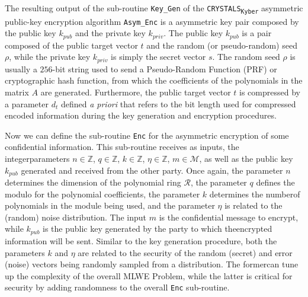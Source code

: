 \documentclass[runningheads]{llncs}
\numberwithin{equation}{section}
\begin{document}
    \noindent The resulting output of the sub-routine \texttt{Key\_Gen} of the \texorpdfstring{\texttt{CRYSTALS}\textsubscript{\texttt{Kyber}}}\/ asymmetric public-key encryption algorithm \texttt{Asym\_Enc} is a asymmetric key pair composed by the public key ${k}_{pub}$ and the private key ${k}_{priv}$. The public key ${k}_{pub}$ is a pair composed of the public target vector $t$ and the random (or pseudo-random) seed $\rho$, while the private key ${k}_{priv}$ is simply the secret vector $s$. The random seed $\rho$ is usually a $256$-bit string used to send a Pseudo-Random Function (PRF) or cryptographic hash function, from which the coefficients of the polynomials in the matrix $A$ are generated. Furthermore, the public target vector $t$ is compressed by a parameter ${d}_{t}$ defined \textit{a priori} that refers to the bit length used for compressed encoded information during the key generation and encryption procedures.

    Now we can define the sub-routine \texttt{Enc} for the asymmetric encryption of some confidential information. This sub-routine receives as inputs, the integer\break parameters $n \in \mathbb{Z}$, $q \in \mathbb{Z}$, $k \in \mathbb{Z}$, $\eta \in \mathbb{Z}$, $m \in \mathcal{M}$, as well as the public key ${k}_{pub}$ generated and received from the other party. Once again, the parameter $n$ determines the dimension of the polynomial ring $\mathcal{R}$, the parameter $q$ defines the modulo for the polynomial coefficients, the parameter $k$ determines the number\break of polynomials in the module being used, and the parameter $\eta$ is related to the (random) noise distribution. The input $m$ is the confidential message to encrypt, while ${k}_{pub}$ is the public key generated by the party to which the\break encrypted information will be sent. Similar to the key generation procedure, both the parameters $k$ and $\eta$ are related to the security of the random (secret) and error (noise) vectors being randomly sampled from a distribution. The former\break can tune up the complexity of the overall MLWE Problem, while the latter is critical for security by adding randomness to the overall \texttt{Enc} sub-routine.

    \vspace{2ex}
\end{document}
